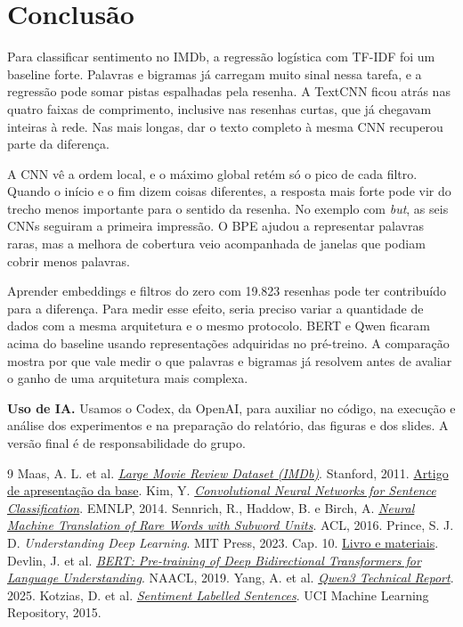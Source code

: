 \section{Conclusão}
Para classificar sentimento no IMDb, a regressão logística com TF-IDF foi
um baseline forte. Palavras e bigramas já carregam muito sinal nessa tarefa,
e a regressão pode somar pistas espalhadas pela resenha. A TextCNN ficou
atrás nas quatro faixas de comprimento, inclusive nas resenhas curtas, que
já chegavam inteiras à rede. Nas mais longas, dar o texto completo à mesma
CNN recuperou parte da diferença.

A CNN vê a ordem local, e o máximo global retém só o pico de cada filtro.
Quando o início e o fim dizem coisas diferentes, a resposta mais forte
pode vir do trecho menos importante para o sentido da resenha. No exemplo
com \textit{but}, as seis CNNs seguiram a primeira impressão. O BPE ajudou
a representar palavras raras, mas a melhora de cobertura veio acompanhada
de janelas que podiam cobrir menos palavras.

Aprender embeddings e filtros do zero com 19.823 resenhas pode ter
contribuído para a diferença. Para medir esse efeito, seria preciso
variar a quantidade de dados com a mesma arquitetura e o mesmo protocolo.
BERT e Qwen ficaram acima do baseline usando representações adquiridas no
pré-treino. A comparação mostra por que vale medir o que palavras e bigramas
já resolvem antes de avaliar o ganho de uma arquitetura mais complexa.

{\small\textbf{Uso de IA.} Usamos o Codex, da OpenAI, para auxiliar no código,
na execução e análise dos experimentos e na preparação do relatório, das figuras
e dos slides. A versão final é de responsabilidade do grupo.\par}

\begin{thebibliography}{9}
\footnotesize
\setlength{\itemsep}{0pt}
\setlength{\parskip}{0pt}
 Maas, A. L. et al.
\href{https://ai.stanford.edu/~amaas/data/sentiment/}{\textit{Large Movie Review Dataset (IMDb)}}.
Stanford, 2011. \href{https://ai.stanford.edu/~amaas/papers/wvSent_acl2011.pdf}{Artigo de apresentação da base}.
 Kim, Y.
\href{https://doi.org/10.3115/v1/D14-1181}{\textit{Convolutional Neural Networks for Sentence Classification}}.
EMNLP, 2014.
 Sennrich, R., Haddow, B. e Birch, A.
\href{https://doi.org/10.18653/v1/P16-1162}{\textit{Neural Machine Translation of Rare Words with Subword Units}}.
ACL, 2016.
 Prince, S. J. D. \textit{Understanding Deep Learning}.
MIT Press, 2023. Cap. 10. \href{https://udlbook.github.io/udlbook/}{Livro e materiais}.
 Devlin, J. et al.
\href{https://arxiv.org/abs/1810.04805}{\textit{BERT: Pre-training of Deep Bidirectional Transformers for Language Understanding}}.
NAACL, 2019.
 Yang, A. et al.
\href{https://arxiv.org/abs/2505.09388}{\textit{Qwen3 Technical Report}}. 2025.
 Kotzias, D. et al.
\href{https://doi.org/10.24432/C57604}{\textit{Sentiment Labelled Sentences}}.
UCI Machine Learning Repository, 2015.
\end{thebibliography}
